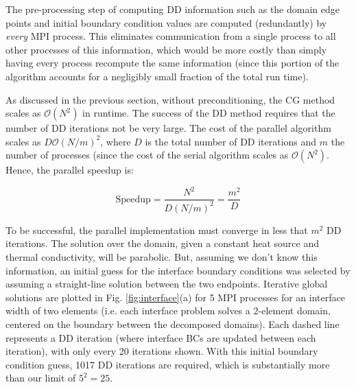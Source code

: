 \documentclass[10pt]{article}
\newcommand{\beq}{\begin{equation}}
\newcommand{\eeq}{\end{equation}}
\begin{document}
The pre-processing step of computing DD information such as the domain edge points and initial boundary condition values are computed (redundantly) by {\it every} MPI process. This eliminates communication from a single process to all other processes of this information, which would be more costly than simply having every process recompute the same information (since this portion of the algorithm accounts for a negligibly small fraction of the total run time). 

As discussed in the previous section, without preconditioning, the CG method scales as \(\mathscr{O}(N^2)\) in runtime. The success of the DD method requires that the number of DD iterations not be very large. The cost of the parallel algorithm scales as \(D\mathscr{O}(N/m)^2\), where \(D\) is the total number of DD iterations and \(m\) the number of processes (since the cost of the serial algorithm scales as \(\mathscr{O}(N^2)\). Hence, the parallel speedup is:

\beq
\textrm{Speedup}=\frac{N^2}{D(N/m)^2}=\frac{m^2}{D}
\eeq

To be successful, the parallel implementation must converge in less that \(m^2\) DD iterations. The solution over the domain, given a constant heat source and thermal conductivity, will be parabolic. But, assuming we don't know this information, an initial guess for the interface boundary conditions was selected by assuming a straight-line solution between the two endpoints. Iterative global solutions are plotted in Fig. \ref{fig:interface}(a) for 5 MPI processes for an interface width of two elements (i.e. each interface problem solves a 2-element domain, centered on the boundary between the decomposed domains). Each dashed line represents a DD iteration (where interface BCs are updated between each iteration), with only every 20 iterations shown. With this initial boundary condition guess, 1017 DD iterations are required, which is substantially more than our limit of \(5^2=25\). 
\end{document}
